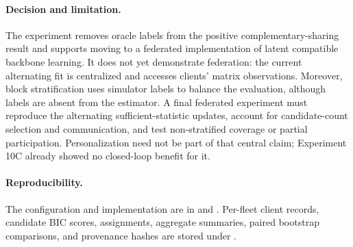 \paragraph{Decision and limitation.}
The experiment removes oracle labels from the positive complementary-sharing
result and supports moving to a federated implementation of latent compatible
backbone learning. It does not yet demonstrate federation: the current
alternating fit is centralized and accesses clients' matrix observations.
Moreover, block stratification uses simulator labels to balance the evaluation,
although labels are absent from the estimator. A final federated experiment
must reproduce the alternating sufficient-statistic updates, account for
candidate-count selection and communication, and test non-stratified coverage
or partial participation. Personalization need not be part of that central
claim; Experiment 10C already showed no closed-loop benefit for it.

\paragraph{Reproducibility.}
The configuration and implementation are in
 and
. Per-fleet
client records, candidate BIC scores, assignments, aggregate summaries, paired
bootstrap comparisons, and provenance hashes are stored under
.
